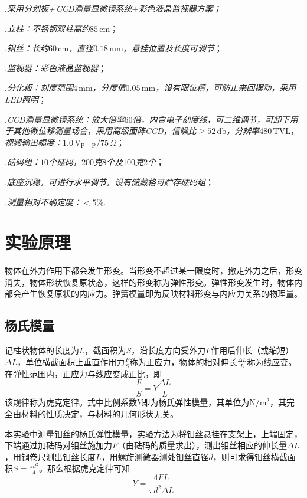\documentclass[UTF-8,twoside,cs4size]{ctexart}
\newcommand*{\tab}{\indent}
\begin{document}
	\tab\tab 1.\textit{采用分划板{\upshape +\,CCD}测量显微镜系统$ + $彩色液晶监视器方案；}
	
	\tab\tab 2.\textit{立柱：不锈钢双柱高约$ 85\,\mathrm{cm} $}；
	
	\tab\tab 3.\textit{钼丝：长约$ 60\,\mathrm{cm} $，直径$ 0.18\,\mathrm{mm} $，悬挂位置及长度可调节}；
	
	\tab\tab 4.\textit{监视器：彩色液晶监视器}；
	
	\tab\tab 5.\textit{分化板：刻度范围$ 4\,\mathrm{mm} $，分度值$ 0.05\,\mathrm{mm} $，设有限位槽，可防止来回摆动，采用{\upshape LED}照明}；
	
	\tab\tab 6.\textit{{\upshape CCD}测量显微镜系统：放大倍率$ 60 $倍，内含电子刻度线，可二维调节，可卸下用于其他微位移测量场合，采用高级面阵{\upshape CCD}，信噪比$ \geq 52\,\mathrm{db} $，分辨率$ 480\,\mathrm{TVL} $，视频输出幅度：$ 1.0\,\mathrm{V_{P-P}}/75\,\Omega $}；
	
	\tab\tab 7.\textit{砝码组：$ 10 $个砝码，$ 200 $克$ 8 $个及$ 100 $克$ 2 $个}；
	
	\tab\tab 8.\textit{底座沉稳，可进行水平调节，设有储藏格可贮存砝码组}；
	
	\tab\tab 9.\textit{测量相对不确定度：$ <5\% $}.
	
	\newpage
	
	\section{实验原理}
	物体在外力作用下都会发生形变。当形变不超过某一限度时，撤走外力之后，形变消失，物体形状恢复原状态，这样的形变称为弹性形变。弹性形变发生时，物体内部会产生恢复原状的内应力。弹簧模量即为反映材料形变与内应力关系的物理量。
	
	\subsection{杨氏模量}
	记柱状物体的长度为$ L $，截面积为$ S $，沿长度方向受外力$ F $作用后伸长（或缩短）$ \Delta L $，单位横截面积上垂直作用力$ \frac FS $称为正应力，物体的相对伸长$ \frac{\Delta L}{L} $称为线应变。在弹性范围内，正应力与线应变成正比，即
	\[\frac FS=Y\frac{\Delta L}{L}\]
	该规律称为虎克定律。式中比例系数$ Y $即为杨氏弹性模量，其单位为$ \mathrm{N/m^2} $，其完全由材料的性质决定，与材料的几何形状无关。
	
	本实验中测量钼丝的杨氏弹性模量，实验方法为将钼丝悬挂在支架上，上端固定，下端通过加砝码对钼丝施加力$ F $（由砝码的质量求出），测出钼丝相应的伸长量$ \Delta L $，用钢卷尺测出钼丝长度$ L $，用螺旋测微器测处钼丝直径$ d $，则可求得钼丝横截面积$ S=\frac{\pi d^2}{4} $。那么根据虎克定律可知
	\[Y=\frac{4FL}{\pi d^2\Delta L}\]
	
\end{document}
